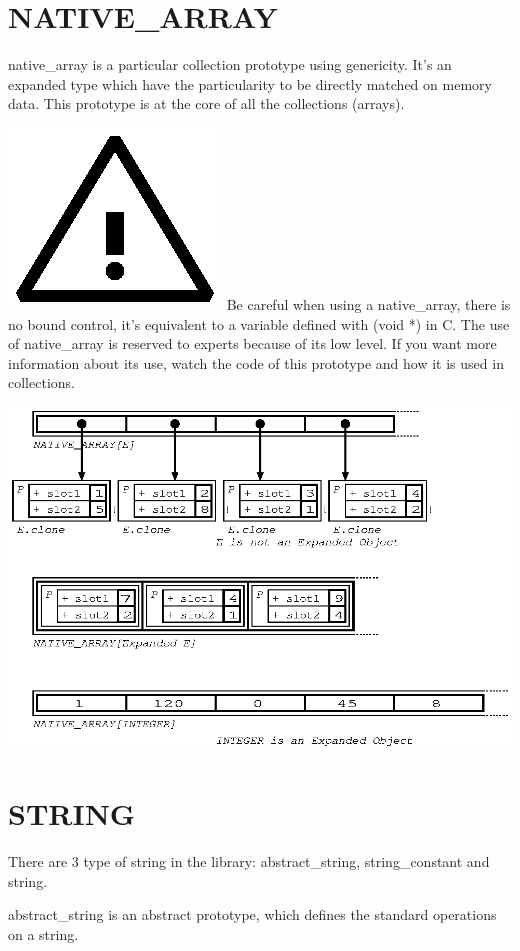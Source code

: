 \documentclass[11pt]{mybook}
\newcommand{\warning}{\includegraphics[scale=0.3]{figures/warning}}
\begin{document}
\section{NATIVE\_ARRAY}
\label{library:native_array}
%
{\sc{}native\_array} is a particular collection prototype using genericity. It's an expanded type which have the particularity to be directly matched on memory data.
This prototype is at the core of all the collections (arrays).

\warning{} Be careful when using a {\sc{}native\_array}, there is no bound control, it's equivalent to a variable defined with (void *) in C.
The use of {\sc{}native\_array} is reserved to experts because of its low level. If you want more information about its use, watch the code of this prototype and how it is used in collections.
\begin{center}
\includegraphics[scale=1.1]{figures/native_array}
\end{center}

\section{STRING}
\label{library:string}
%
There are 3 type of string in the library: {\sc{}abstract\_string}, {\sc{}string\_constant} and {\sc{}string}.

{\sc{}abstract\_string} is an abstract prototype, which defines the standard operations on a string.
\end{document}
